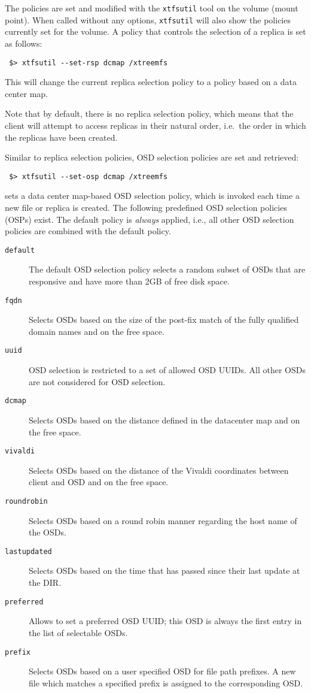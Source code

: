 \documentclass[a4paper,10pt]{book}
\begin{document}
The policies are set and modified with the \texttt{xtfsutil} tool on the volume (mount point). When called without any options, \texttt{xtfsutil} will also show the policies currently set for the volume. A policy that controls the selection of a replica is set as follows:

\begin{verbatim}
 $> xtfsutil --set-rsp dcmap /xtreemfs
\end{verbatim}

This will change the current replica selection policy to a policy based on a data center map.

Note that by default, there is no replica selection policy, which means that the client will attempt to access replicas in their natural order, i.e.\ the order in which the replicas have been created.

Similar to replica selection policies, OSD selection policies are set and retrieved:

\begin{verbatim}
 $> xtfsutil --set-osp dcmap /xtreemfs
\end{verbatim}

sets a data center map-based OSD selection policy, which is invoked each time a new file or replica is created. 
The following predefined OSD selection policies (OSPs) exist.
The default policy is \emph{always} applied, i.e., all other OSD selection policies are combined with the default policy.

\begin{description}
 \item[\texttt{default}] The default OSD selection policy selects a random subset of OSDs that are responsive and have more than 2GB of free disk space.
 \item[\texttt{fqdn}] Selects OSDs based on the size of the post-fix match of the fully qualified domain names and on the free space.
 \item[\texttt{uuid}] OSD selection is restricted to a set of allowed OSD UUIDs. All other OSDs are not considered for OSD selection.
 \item[\texttt{dcmap}] Selects OSDs based on the distance defined in the datacenter map and on the free space.
 \item[\texttt{vivaldi}] Selects OSDs based on the distance of the Vivaldi coordinates between client and OSD and on the free space.
 \item[\texttt{roundrobin}] Selects OSDs based on a round robin manner regarding the host name of the OSDs.
 \item[\texttt{lastupdated}] Selects OSDs based on the time that has passed since their last update at the DIR.
 \item[\texttt{preferred}] Allows to set a preferred OSD UUID; this OSD is always the first entry in the list of selectable OSDs.
 \item[\texttt{prefix}] Selects OSDs based on a user specified OSD for file path prefixes. A new file which matches a specified prefix is assigned to the corresponding OSD. 
\end{description}
\end{document}
